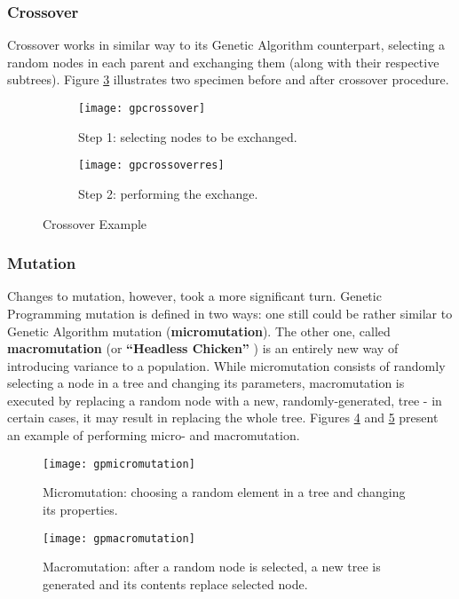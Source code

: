 \subsubsection{Crossover}
Crossover works in similar way to its Genetic Algorithm counterpart, selecting a random nodes in each parent and exchanging them (along with their respective subtrees). Figure \ref{fig:x gpcrossoverexample} illustrates two specimen before and after crossover procedure.
\begin{figure}[h]
    \centering
    \begin{subfigure}[b]{0.5\textwidth}
        \centering
        \texttt{[image: gpcrossover]}
        \caption{Step 1: selecting nodes to be exchanged.}
        \label{fig:gpcrossover1}
    \end{subfigure}
    \hfill
    \begin{subfigure}[b]{0.5\textwidth}
        \centering
        \texttt{[image: gpcrossoverres]}
        \caption{Step 2: performing the exchange.}
        \label{fig:gpcrossover2}
    \end{subfigure}
    \caption{Crossover Example}
    \label{fig:x gpcrossoverexample}
\end{figure}
\subsubsection{Mutation}
Changes to mutation, however, took a more significant turn. Genetic Programming mutation is defined in two ways: one still could be rather similar to Genetic Algorithm mutation (\textbf{micromutation}). The other one, called \textbf{macromutation} (or \textbf{``Headless Chicken''} ) is an entirely new way of introducing variance to a population. While micromutation consists of randomly selecting a node in a tree and changing its parameters, macromutation is executed by replacing a random node with a new, randomly-generated, tree - in certain cases, it may result in replacing the whole tree. Figures \ref{fig:x gpmicromutationexample} and \ref{fig:x gpmacromutationexample} present an example of performing micro- and macromutation.
\begin{figure}[h]
    \centering
    \texttt{[image: gpmicromutation]}
    \caption{Micromutation: choosing a random element in a tree and changing its properties.}
    \label{fig:x gpmicromutationexample}
\end{figure}
\begin{figure}[h]
    \centering
    \texttt{[image: gpmacromutation]}
    \caption{Macromutation: after a random node is selected, a new tree is generated and its contents replace selected node.}
    \label{fig:x gpmacromutationexample}
\end{figure}
